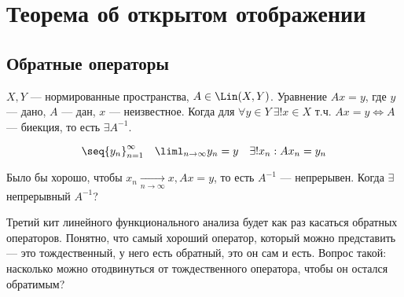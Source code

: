 \documentclass[document]{subfiles}
\begin{document}
\chapter{Теорема об открытом отображении}
\section{Обратные операторы}

$X,Y$ --- нормированные пространства, $A \in \Lin(X,Y)$. Уравнение $Ax = y$, где $y$ --- дано, $A$ --- дан, $x$ --- неизвестное.
Когда для $\forall y \in Y \: \exists! x \in X$ т.ч. $Ax = y \Leftrightarrow A$ --- биекция, то есть $\exists A^{-1}$. 

\[ \seq{y_n}^\infty_{n=1} \quad \liml_{n \to \infty} y_n = y \quad \exists! x_n : Ax_n = y_n \] 

Было бы хорошо, чтобы $x_n \underset{n \to \infty}{\longrightarrow} x, Ax = y$, то есть $A^{-1}$ --- непрерывен. Когда $\exists$ непрерывный $A^{-1}$?



Третий кит линейного функционального анализа будет как раз касаться обратных операторов. Понятно, что самый хороший оператор, который можно представить --- это тождественный, у него есть обратный, это он сам и есть.
 Вопрос такой: насколько можно отодвинуться от тождественного оператора, чтобы он остался обратимым?
\end{document}
